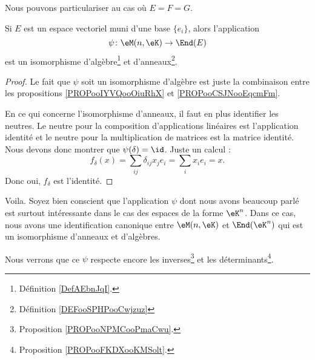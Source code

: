 Nous pouvons particulariser au cas où \( E=F=G\).
\begin{proposition}     \label{PROPooFMBFooEVCLKA}
    Si \( E\) est un espace vectoriel muni d'une base \( \{ e_i \}\), alors l'application
    \begin{equation}
        \psi\colon \eM(n,\eK)\to \End(E)
    \end{equation}
    est un isomorphisme d'algèbre\footnote{Définition \ref{DefAEbnJqI}.} et d'anneaux\footnote{Définition \ref{DEFooSPHPooCwjzuz}}.
\end{proposition}

\begin{proof}
    Le fait que \( \psi\) soit un isomorphisme d'algèbre est juste la combinaison entre les propositions \ref{PROPooIYVQooOiuRhX} et \ref{PROPooCSJNooEqcmFm}.

    En ce qui concerne l'isomorphisme d'anneaux, il faut en plus identifier les neutres. Le neutre pour la composition d'applications linéaires est l'application identité et le neutre pour la multiplication de matrices est la matrice identité. Nous devons donc montrer que \( \psi(\delta)=\id\). Juste un calcul :
    \begin{equation}
        f_{\delta}(x)=\sum_{ij}\delta_{ij}x_je_i=\sum_ix_ie_i=x.
    \end{equation}
    Donc oui, \( f_{\delta}\) est l'identité.
\end{proof}

Voila. Soyez bien conscient que l'application \( \psi\) dont nous avons beaucoup parlé est surtout intéressante dans le cas des espaces de la forme \( \eK^n\). Dans ce cas, nous avons une identification canonique entre \( \eM(n,\eK)\) et \( \End(\eK^n)\) qui est un isomorphisme d'anneaux et d'algèbres.

Nous verrons que ce \( \psi\) respecte encore les inverses\footnote{Proposition \ref{PROPooNPMCooPmaCwu}.} et les déterminants\footnote{Proposition \ref{PROPooFKDXooKMSolt}.}.


